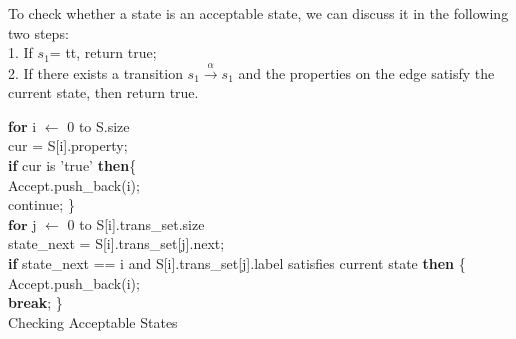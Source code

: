 To check whether a state is an acceptable state, we can discuss it in the following two steps: \\
1. If $s_1 $= tt, return true; \\
2. If there exists a transition  $ s_1 \overset{\alpha}{\rightarrow}s_1$ and  the properties on the edge satisfy the current state, then return true. \\

\IncMargin{1em}
 \begin{algorithm}[H]
    \SetAlgoNoLine
    \BlankLine
\textbf{for} i $\leftarrow$  0 to S.size  \\
\qquad cur = S[i].property;  \\
\qquad  \textbf{if} cur is 'true'   \textbf{then}\{      \\
\qquad \quad Accept.push\_back(i);     \\
\qquad \quad  continue;  \}     \\
\qquad  $ \textbf{for}$ j $\leftarrow$  0 to S[i].trans\_set.size \\
\qquad \quad state\_next = S[i].trans\_set[j].next;  \\
\qquad \quad \textbf{if} state\_next == i and S[i].trans\_set[j].label satisfies current state \textbf{then} \{  \\
\qquad \qquad Accept.push\_back(i);  \\
\qquad \qquad \textbf{break}; \} \\
 \caption{Checking Acceptable States}
\end{algorithm}
